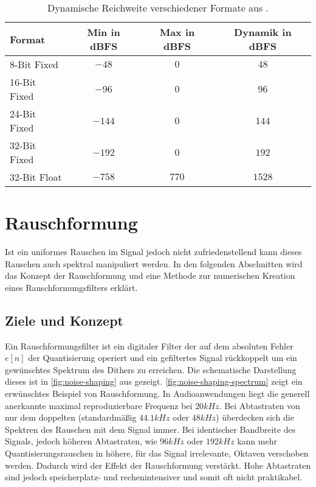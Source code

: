 \begin{table}[]
    \centering
    \begin{tabular}{|l|c|c|c|}
        \hline
        \textbf{Format} & \textbf{Min} in \gls{dBFS} & \textbf{Max} in \gls{dBFS} & \textbf{Dynamik} in \gls{dBFS} \\ \hline \hline
        8-Bit Fixed & $-48$ & $0$ & $48$ \\ \hline
        16-Bit Fixed & $-96$ & $0$ & $96$ \\ \hline
        24-Bit Fixed & $-144$ & $0$ & $144$ \\ \hline
        32-Bit Fixed & $-192$ & $0$ & $192$ \\ \hline
        32-Bit Float & $-758$ & $770$ & $1528$ \\ \hline
    \end{tabular}
    \caption[Dynamische Reichweite verschiedener Formate]{Dynamische Reichweite verschiedener Formate aus \autocite{32bit}.}
    \label{tab:dynamic-range}
\end{table}

\section{Rauschformung}

Ist ein uniformes Rauschen im Signal jedoch nicht zufriedenstellend kann dieses Rauschen auch spektral manipuliert werden.
In den folgenden Abschnitten wird das Konzept der Rauschformung und eine Methode zur numerischen Kreation eines Rauschformungsfilters erklärt.

\subsection{Ziele und Konzept}

Ein Rauschformungsfilter ist ein digitaler Filter der auf dem absoluten Fehler $e[n]$ der Quantisierung operiert und ein gefiltertes Signal rückkoppelt um ein gewünschtes Spektrum des Dithers zu erreichen.
Die schematische Darstellung dieses ist in \autoref{fig:noise-shaping} aus \autocite{noise-shaping} gezeigt.
\autoref{fig:noise-shaping-spectrum} zeigt ein erwünschtes Beispiel von Rauschformung.
In Audioanwendungen liegt die generell anerkannte maximal reproduzierbare Frequenz bei $20\si{kHz}$.
Bei Abtastraten von nur dem doppelten (standardmäßig $44.1\si{kHz}$ oder $48\si{kHz}$) überdecken sich die Spektren des Rauschen mit dem Signal immer.
Bei identischer Bandbreite des Signals, jedoch höheren Abtastraten, wie $96\si{kHz}$ oder $192\si{kHz}$ kann mehr Quantisierungsrauschen in höhere, für das Signal irrelevante, Oktaven verschoben werden.
Dadurch wird der Effekt der Rauschformung verstärkt.
Hohe Abtastraten sind jedoch speicherplatz- und rechenintensiver und somit oft nicht praktikabel.

